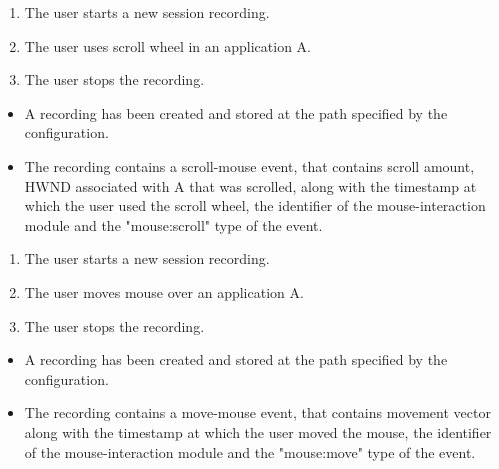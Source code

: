 \begin{tests}
	{\begin{enumerate}
		\item The user starts a new session recording.
		\item The user uses scroll wheel in an application A.
		\item The user stops the recording.
	\end{enumerate}}
	{\begin{itemize}
		\item A recording has been created and stored at the path specified by the configuration.
		\item The recording contains a scroll-mouse event, that contains scroll amount, HWND associated with A that was scrolled, along with the timestamp at which the user used the scroll wheel, the identifier of the mouse-interaction module and the "mouse:scroll" type of the event.
	\end{itemize}}
	
	{\begin{enumerate}
		\item The user starts a new session recording.
		\item The user moves mouse over an application A.
		\item The user stops the recording.
	\end{enumerate}}
	{\begin{itemize}
		\item A recording has been created and stored at the path specified by the configuration.
		\item The recording contains a move-mouse event, that contains movement vector along with the timestamp at which the user moved the mouse, the identifier of the mouse-interaction module and the "mouse:move" type of the event.
	\end{itemize}}
\end{tests}
